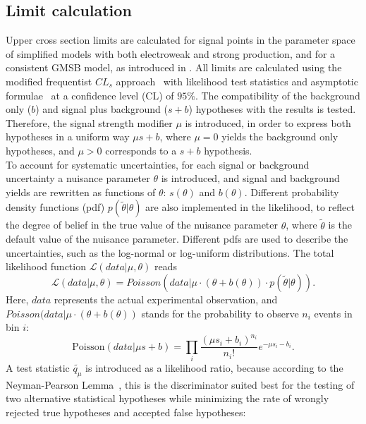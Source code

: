 \subsection{Limit calculation}
Upper cross section limits are calculated for signal points in the parameter space of simplified models with both electroweak and strong production, and for a consistent GMSB model, as introduced in . All limits are calculated using the modified frequentist $CL_s$ approach~\cite{CLS1,CLS2,CLS3} with likelihood test statistics and asymptotic formulae~\cite{AsymptoticFormulae,AsymptoticFormulae2} at a confidence level (CL) of $95\%$. The compatibility of the background only ($b$) and signal plus background ($s+b$) hypotheses with the results is tested. Therefore, the signal strength modifier $\mu$ is introduced, in order to express both hypotheses in a uniform way $\mu s+b$, where $\mu=0$ yields the background only hypotheses, and $\mu>0$ corresponds to a $s+b$ hypothesis.\\
To account for systematic uncertainties, for each signal or background uncertainty a nuisance parameter $\theta$ is introduced, and signal and background yields are rewritten as functions of $\theta$: $s(\theta)$ and $b(\theta)$. Different probability density functions (pdf) $p(\tilde{\theta}|\theta)$ are also implemented in the likelihood, to reflect the degree of belief in the true value of the nuisance parameter $\theta$, where $\tilde{\theta}$ is the default value of the nuisance parameter. Different pdfs are used to describe the uncertainties, such as the log-normal or log-uniform distributions. The total likelihood function $\mathcal{L}(data|\mu,\theta)$ reads
\begin{equation}
 \mathcal{L}(data|\mu,\theta)= Poisson(data|\mu\cdot(\theta+b(\theta))\cdot p(\tilde{\theta}|\theta)).
\end{equation}
Here, $data$ represents the actual experimental observation, and $Poisson(data|\mu\cdot(\theta+b(\theta))$ stands for the probability to observe $n_i$ events in bin $i$:
\begin{equation}
 \mathrm{Poisson}(data|\mu s+b)=\prod_i \frac{(\mu s_i+b_i)^{n_i}}{n_i!}e^{-\mu s_i - b_i}.
\end{equation}
A test statistic $\tilde{q_\mu}$ is introduced as a likelihood ratio, because according to the Neyman-Pearson Lemma~\cite{NeymanPearson}, this is the discriminator suited best for the testing of two alternative statistical hypotheses while minimizing the rate of wrongly rejected true hypotheses and accepted false hypotheses:
